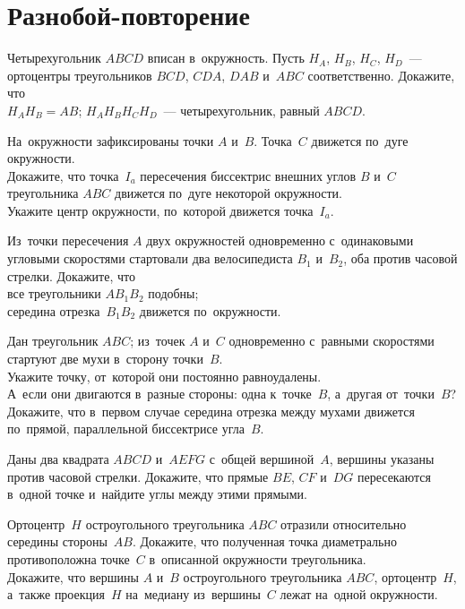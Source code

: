 
\section*{Разнобой-повторение}


\begin{problems}

\item
Четырехугольник $ABCD$ вписан в~окружность.
Пусть $H_A$, $H_B$, $H_C$, $H_D$~--- ортоцентры треугольников
$BCD$, $CDA$, $DAB$ и~$ABC$ соответственно.
Докажите, что
\\
\sp $H_A H_B = AB$;
\quad
\sp $H_A H_B H_C H_D$~--- четырехугольник, равный $ABCD$.

\item
На~окружности зафиксированы точки $A$ и~$B$.
Точка~$C$ движется по~дуге окружности.
\\
\sp
Докажите, что точка~$I_a$ пересечения биссектрис внешних углов $B$ и~$C$
треугольника $ABC$ движется по~дуге некоторой окружности.
\\
\sp
Укажите центр окружности, по~которой движется точка~$I_a$.

\item
Из~точки пересечения $A$ двух окружностей одновременно с~одинаковыми угловыми
скоростями стартовали два велосипедиста $B_1$ и~$B_2$, оба против часовой
стрелки.
Докажите, что
\\
\sp все треугольники $A B_1 B_2$ подобны;
\\
\sp середина отрезка~$B_1 B_2$ движется по~окружности.

\item
Дан треугольник $ABC$;
из~точек $A$ и~$C$ одновременно с~равными скоростями стартуют две мухи
в~сторону точки~$B$.
\\
\sp
Укажите точку, от~которой они постоянно равноудалены.
\\
\sp
А~если они двигаются в~разные стороны: одна к~точке~$B$, а~другая от~точки~$B$?
\\
\sp
Докажите, что в~первом случае середина отрезка между мухами движется по~прямой,
параллельной биссектрисе угла~$B$.

\item
Даны два квадрата $ABCD$ и~$AEFG$ с~общей вершиной~$A$, вершины указаны против
часовой стрелки.
Докажите, что прямые $BE$, $CF$ и~$DG$ пересекаются в~одной точке и~найдите
углы между этими прямыми.

\item
\sp
Ортоцентр~$H$ остроугольного треугольника $ABC$ отразили относительно середины
стороны~$AB$.
Докажите, что полученная точка диаметрально противоположна точке~$C$
в~описанной окружности треугольника.
\\
\sp
Докажите, что вершины $A$ и~$B$ остроугольного треугольника $ABC$,
ортоцентр~$H$, а~также проекция~$H$ на~медиану из~вершины~$C$ лежат на~одной
окружности.

\end{problems}

